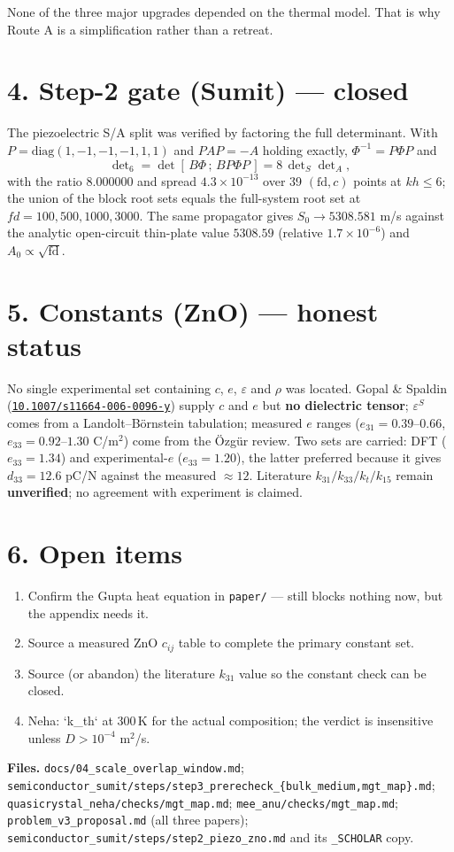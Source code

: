 \documentclass[11pt]{article}
\newcommand{\doi}[1]{\href{https://doi.org/#1}{\texttt{#1}}}
\begin{document}
\noindent None of the three major upgrades depended on the thermal model. That is why Route A is a
simplification rather than a retreat.

\section*{4. Step-2 gate (Sumit) --- closed}

The piezoelectric S/A split was verified by factoring the full determinant. With
$P=\mathrm{diag}(1,-1,-1,-1,1,1)$ and $PAP=-A$ holding exactly, $\Phi^{-1}=P\Phi P$ and
\[
\det\nolimits_{6}=\det[\,B\Phi\,;\,B P\Phi P\,]=8\,\det\nolimits_{S}\det\nolimits_{A},
\]
with the ratio $8.000000$ and spread $4.3\times10^{-13}$ over 39 $(\mathrm{fd},c)$ points at $kh\le6$;
the union of the block root sets equals the full-system root set at $fd=100,500,1000,3000$. The same
propagator gives $S_0\to5308.581$ m/s against the analytic open-circuit thin-plate value $5308.59$
(relative $1.7\times10^{-6}$) and $A_0\propto\sqrt{\mathrm{fd}}$.

\section*{5. Constants (ZnO) --- honest status}

No single experimental set containing $c$, $e$, $\varepsilon$ and $\rho$ was located. Gopal \& Spaldin
(\doi{10.1007/s11664-006-0096-y}) supply $c$ and $e$ but \textbf{no dielectric tensor}; $\varepsilon^S$
comes from a Landolt--B\"ornstein tabulation; measured $e$ ranges ($e_{31}=0.39$--$0.66$,
$e_{33}=0.92$--$1.30$ C/m$^2$) come from the \"Ozg\"ur review. Two sets are carried: DFT ($e_{33}=1.34$)
and experimental-$e$ ($e_{33}=1.20$), the latter preferred because it gives $d_{33}=12.6$ pC/N against
the measured $\approx12$. Literature $k_{31}/k_{33}/k_t/k_{15}$ remain \textbf{unverified}; no
agreement with experiment is claimed.

\section*{6. Open items}

\begin{enumerate}\small
\item Confirm the Gupta heat equation in \texttt{paper/} --- still blocks nothing now, but the appendix
needs it.
\item Source a measured ZnO $c_{ij}$ table to complete the primary constant set.
\item Source (or abandon) the literature $k_{31}$ value so the constant check can be closed.
\item Neha: `k_th` at 300\,K for the actual composition; the verdict is insensitive unless $D>10^{-4}$ m$^2$/s.
\end{enumerate}

\noindent\textbf{Files.} \texttt{docs/04\_scale\_overlap\_window.md};
\texttt{semiconductor\_sumit/steps/step3\_prerecheck\_\{bulk\_medium,mgt\_map\}.md};
\texttt{quasicrystal\_neha/checks/mgt\_map.md}; \texttt{mee\_anu/checks/mgt\_map.md};
\texttt{problem\_v3\_proposal.md} (all three papers);
\texttt{semiconductor\_sumit/steps/step2\_piezo\_zno.md} and its \texttt{\_SCHOLAR} copy.
\end{document}
